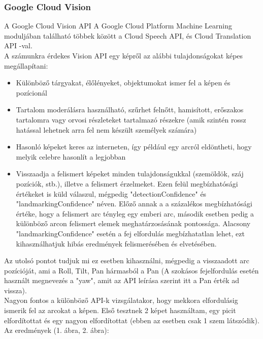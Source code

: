 \subsubsection{Google Cloud Vision}
A Google Cloud Vision API \cite{GoogleCloudVision} A Google Cloud Platform Machine Learning moduljában található többek között a Cloud Speech API, és Cloud Translation API -val.
\\A számunkra érdekes Vision API egy képről az alábbi tulajdonságokat képes megállapítani:
\begin{itemize}
\item Különböző tárgyakat, élőlényeket, objektumokat ismer fel a képen és pozícionál
\item Tartalom moderálásra használható, szűrhet felnőtt, hamisított, erőszakos tartalomra vagy orvosi részleteket tartalmazó részekre (amik szintén rossz hatással lehetnek arra fel nem készült személyek számára)
\item Hasonló képeket keres az interneten, így például egy arcról eldöntheti, hogy melyik celebre hasonlít a legjobban
\item Visszaadja a felismert képeket minden tulajdonságukkal (szemöldök, száj pozíciók, stb.), illetve a felismert érzelmeket. Ezen felül megbízhatósági értékeket is küld válaszul, mégpedig "detectionConfidence" és "landmarkingConfidence" néven. Előző annak a a százalékos megbízhatósági értéke, hogy a felismert arc tényleg egy emberi arc, második esetben pedig a különböző arcon felismert elemek meghatárzosásának pontossága. Alacsony "landmarkingConfidence" esetén a fej elfordulás megbízhatatlan lehet, ezt kihasználhatjuk hibás eredmények felismerésében és elvetésében.
\end{itemize}

Az utolsó pontot tudjuk mi ez esetben kihasználni, mégpedig a visszaadott arc pozícióját, ami a Roll, Tilt, Pan hármasból a Pan (A szokásos fejelfordulás esetén használt megnevezés a "yaw", amit az API leírása szerint itt a Pan érték ad vissza).
\\Nagyon fontos a különböző API-k vizsgálatakor, hogy mekkora elfordulásig ismerik fel az arcokat a képen. Első tesztnek 2 képet használtam, egy picit elfordítottat és egy nagyon elfordítottat (ebben az esetben csak 1 szem látszódik).
Az eredmények (1. ábra, 2. ábra): \\

